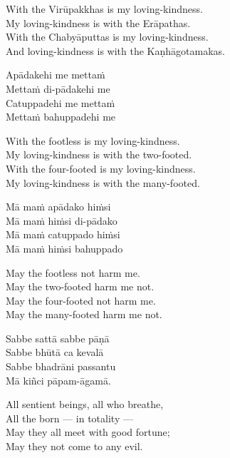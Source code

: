 \begin{english-verses}
  With the Virūpakkhas is my loving-kindness.\\
  My loving-kindness is with the Erāpathas.\\
  With the Chabyāputtas is my loving-kindness.\\
  And loving-kindness is with the Kaṇhāgotamakas.
\end{english-verses}

\begin{pali-hang-continued}
  Apādakehi me mettaṁ\\
  Mettaṁ di-pādakehi me\\
  Catuppadehi me mettaṁ\\
  Mettaṁ bahuppadehi me
\end{pali-hang-continued}

\begin{english-verses}
  With the footless is my loving-kindness.\\
  My loving-kindness is with the two-footed.\\
  With the four-footed is my loving-kindness.\\
  My loving-kindness is with the many-footed.
\end{english-verses}

\begin{pali-hang-continued}
  Mā maṁ apādako hiṁsi\\
  Mā maṁ hiṁsi di-pādako\\
  Mā maṁ catuppado hiṁsi\\
  Mā maṁ hiṁsi bahuppado
\end{pali-hang-continued}

\begin{english-verses}
  May the footless not harm me.\\
  May the two-footed harm me not.\\
  May the four-footed not harm me.\\
  May the many-footed harm me not.
\end{english-verses}

\begin{pali-hang-continued}
  Sabbe sattā sabbe pāṇā\\
  Sabbe bhūtā ca kevalā\\
  Sabbe bhadrāni passantu\\
  Mā kiñci pāpam-āgamā.
\end{pali-hang-continued}

\begin{english-verses}
  All sentient beings, all who breathe,\\
  All the born — in totality —\\
  May they all meet with good fortune;\\
  May they not come to any evil.
\end{english-verses}

